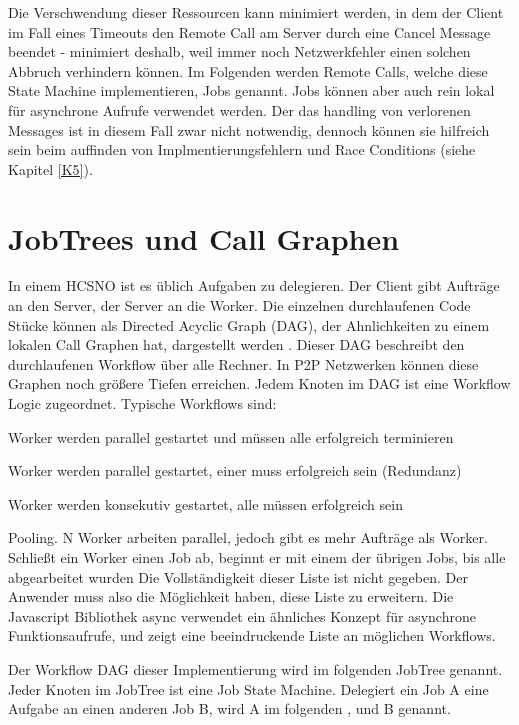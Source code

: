 Die Verschwendung dieser Ressourcen kann minimiert werden, in dem der Client im Fall eines Timeouts den Remote Call am Server durch eine Cancel Message beendet
- minimiert deshalb, weil immer noch Netzwerkfehler einen solchen Abbruch verhindern können.
Im Folgenden werden Remote Calls, welche diese State Machine implementieren, Jobs genannt.
Jobs können aber auch rein lokal für asynchrone Aufrufe verwendet werden.
Der das handling von verlorenen Messages ist in diesem Fall zwar nicht notwendig, dennoch können sie hilfreich sein beim auffinden von Implmentierungsfehlern und Race Conditions (siehe Kapitel \ref{K5}).





\section{JobTrees und Call Graphen}
In einem HCSNO ist es üblich Aufgaben zu delegieren. Der Client gibt Aufträge an den Server, der Server an die Worker.
Die einzelnen durchlaufenen Code Stücke können als Directed Acyclic Graph (DAG), der Ahnlichkeiten zu einem lokalen Call Graphen hat, dargestellt werden \cite{yu2005taxonomy}.
Dieser DAG beschreibt den durchlaufenen Workflow über alle Rechner.
In P2P Netzwerken können diese Graphen noch größere Tiefen erreichen.
Jedem Knoten im DAG ist eine Workflow Logic zugeordnet. Typische Workflows sind:
\BCL
  \item Worker werden parallel gestartet und müssen alle erfolgreich terminieren
  \item Worker werden parallel gestartet, einer muss erfolgreich sein (Redundanz)
  \item Worker werden konsekutiv gestartet, alle müssen erfolgreich sein
  \item Pooling. N Worker arbeiten parallel, jedoch gibt es mehr Aufträge als Worker. Schließt ein Worker einen Job ab, beginnt er mit einem der übrigen Jobs, bis alle abgearbeitet wurden
\ECL
Die Vollständigkeit dieser Liste ist nicht gegeben.
Der Anwender muss also die Möglichkeit haben, diese Liste zu erweitern.
Die Javascript Bibliothek async \cite{async} verwendet ein ähnliches Konzept für asynchrone Funktionsaufrufe, und zeigt eine beeindruckende Liste an möglichen Workflows.

Der Workflow DAG dieser Implementierung wird im folgenden JobTree genannt.
Jeder Knoten im JobTree ist eine Job State Machine.
Delegiert ein Job A eine Aufgabe an einen anderen Job B, wird A im folgenden \ParentJob{}, und B \SubJob{} genannt.

